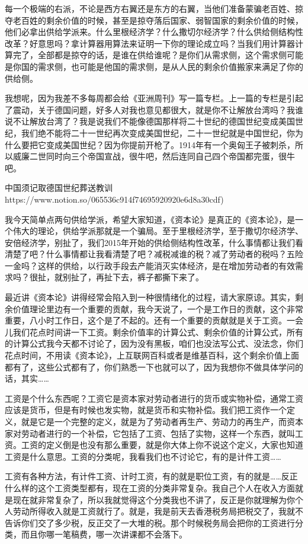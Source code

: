 \documentclass[UTF8, 12pt, a4paper]{ctexrep}
\begin{document}
每一个极端的右派，不论是西方右翼还是东方的右翼，当他们准备蒙骗老百姓、掠夺老百姓的剩余价值的时候，甚至是掠夺落后国家、弱智国家的剩余价值的时候，他们必拿出供给学派来。什么里根经济学？什么撒切尔经济学？什么供给侧结构性改革？好意思吗？拿计算器用算法来证明一下你的理论成立吗？当我们用计算器计算完了，全部都是掠夺的话，是谁在供给谁呢？是你们从需求侧，这个需求侧可能是你国的需求侧，也可能是他国的需求侧，是从人民的剩余价值搬家来满足了你的供给侧。

我想呢，因为我差不多每周都会给《亚洲周刊》写一篇专栏。上一篇的专栏是引起了震动，关于德国问题，好多人对我也意见都很大，就是你不让解放台湾吗？我谁说不让解放台湾了？我是说我们不能像德国那样将二十世纪的德国世纪变成美国世纪，我们绝不能将二十一世纪再次变成美国世纪，二十一世纪就是中国世纪，你为什么要把它变成美国世纪？因为你提前开枪了。1914年有一个奥匈王子被刺杀，所以威廉二世同时向三个帝国宣战，很牛吧，然后连同自己四个帝国都完蛋，很牛吧。

中国须记取德国世纪葬送教训 https://www.notion.so/065536c914f74695920920e6d8a30cdf)

我今天简单点两句供给学派，希望大家知道，《资本论》是真正的《资本论》，是一个伟大的理论，供给学派那就是一个骗局。至于里根经济学，至于撒切尔经济学、安倍经济学，别扯了，我们2015年开始的供给侧结构性改革，什么事情都让我们看清楚了吧？什么事情都让我看清楚了吧？减税减谁的税？减了劳动者的税吗？五险一金吗？这样的供给，以行政手段去产能消灭实体经济，是在增加劳动者的有效需求吗？很扯，就别扯了，再扯下去，裤子都撕下来了。

最近讲《资本论》讲得经常会陷入到一种很情绪化的过程，请大家原谅。其实，剩余价值理论里边有一个重要的贡献，我今天说了，一个是工作日的贡献，这个非常重要，八小时工作日，这个是了不起的。还有一个重要的贡献就是关于工资。一会儿我们花点时间讲一下工资。剩余价值率的计算公式、剩余价值的计算公式，所有的计算公式我今天都不讨论了，因为没有黑板，咱们也没法写公式、没法念，你们花点时间，不用读《资本论》，上互联网百科或者是维基百科，这个剩余价值上面都有了，这些公式都有了，你们熟悉一下也就可以了，因为我想你不做具体学问的话，其实……

工资是个什么东西呢？工资它是资本家对劳动者进行的货币或实物补偿，通常工资应该是货币，但是有时候也发实物，就是货币和实物补偿。我们把工资作一个定义，就是它是一个完整的定义，就是为了劳动者再生产、劳动力的再生产，而资本家对劳动者进行的一个补偿，它包括了工资、包括了实物，这样一个东西，就叫工资。工资的定义倒是也没有那么重要，就是你大体上你不说这个定义，大家也知道工资是什么意思。工资的分类呢，我看我们也不讨论它，有的是计件工资……

工资有各种方法，有计件工资、计时工资，有的就是职位工资，有的就是……反正什么样的这个工资类型都有，现在工资的分类非常复杂。我自己个人在收入方面就是现在就非常复杂了，所以我就觉得这个分类我也不讲了，反正是你就理解为你个人劳动所得收入就是工资就行了。就是，我是前天去香港税务局把税交了，我就不告诉你们交了多少税，反正交了一大堆的税。那个时候税务局会把你的工资进行分类，而且你哪一笔稿费，哪一次讲课都不会落下。
\end{document}
